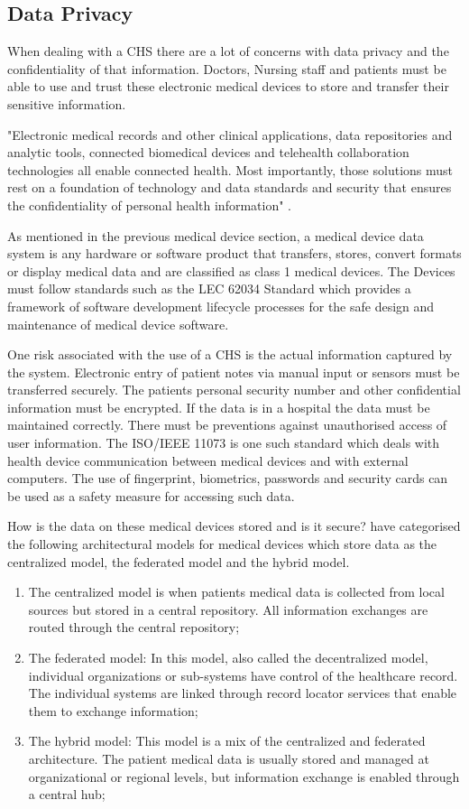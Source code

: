 \subsection{Data Privacy}

When dealing with a CHS there are a lot of concerns with data privacy and the confidentiality of that information. Doctors, Nursing staff and patients must be able to use and trust these electronic medical devices to store and transfer their sensitive information.

"Electronic medical records and other clinical applications, data repositories and analytic tools, connected biomedical devices and telehealth collaboration technologies all enable connected health. Most importantly, those solutions must rest on a foundation of technology and data standards and security that ensures the confidentiality of personal health information" \parencite{chg}.

As mentioned in the previous medical device section, a medical device data system is any hardware or software product that transfers, stores, convert formats or display medical data and are classified as class 1 medical devices. The Devices must follow standards such as the LEC 62034 Standard which provides a framework of software development lifecycle processes for the safe design and maintenance of medical device software. 
 
One risk associated with the use of a CHS is the actual information captured by the system.  Electronic entry of patient notes via manual input or sensors must be transferred securely. The patients personal security number and other confidential information must be encrypted. If the data is in a hospital the data must be maintained correctly. There must be preventions against unauthorised access of user information. The ISO/IEEE 11073 is one such standard which deals with health device communication between medical devices and with external computers. The use of fingerprint, biometrics, passwords and security cards can be used as a safety measure for accessing such data.

How is the data on these medical devices stored and is it secure? \cite{wilcox} have categorised the following architectural models for medical devices which store data as the centralized model, the federated model and the hybrid model.
\begin{enumerate}
\item The centralized model is when patients medical data is collected from local sources but stored in a central repository. All information exchanges are routed through the central repository;
\item The federated model: In this model, also called the decentralized model, individual organizations or sub-systems have control of the healthcare record. The individual systems are linked through record locator services that enable them to exchange information;
\item The hybrid model: This model is a mix of the centralized and federated architecture. The patient medical data is usually stored and managed at organizational or regional levels, but information exchange is enabled through a central hub;
\end{enumerate}

